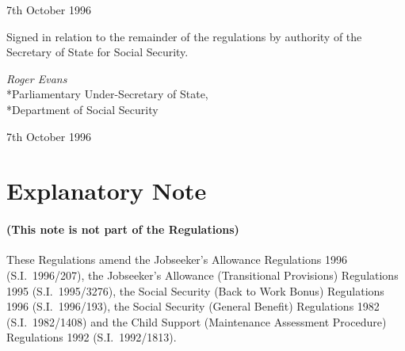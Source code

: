 \documentclass[a4paper]{article}
\newcommand{\parthead}{}
\begin{document}
7th October 1996

\bigskip

Signed 
in relation to the remainder of the regulations
by authority of the Secretary of State for Social Security.

{\raggedleft
\emph{Roger Evans}\\*Parliamentary Under-Secretary of State,\\*Department of Social Security

}

7th October 1996

\bigskip

\part{Explanatory Note}

\renewcommand\parthead{--- Explanatory Note}

\subsection*{(This note is not part of the Regulations)}

These Regulations amend the Jobseeker’s Allowance Regulations 1996 (S.I.\ 1996/207), the Jobseeker’s Allowance (Transitional Provisions) Regulations 1995 (S.I.\ 1995/3276), the Social Security (Back to Work Bonus) Regulations 1996 (S.I.\ 1996/193), the Social Security (General Benefit) Regulations 1982 (S.I.\ 1982/1408) and the Child Support (Maintenance Assessment Procedure) Regulations 1992 (S.I.\ 1992/1813).
\end{document}
